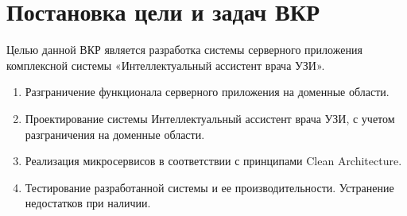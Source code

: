 \section{Постановка цели и задач ВКР}

Целью данной ВКР является разработка системы серверного приложения комплексной системы «Интеллектуальный ассистент врача УЗИ».

\begin{enumerate}
    \item Разграничение функционала серверного приложения на доменные области.
    \item Проектирование системы Интеллектуальный ассистент врача УЗИ, с учетом разграничения на доменные области.
    \item Реализация микросервисов в соответствии с принципами Clean Architecture.
	\item Тестирование разработанной системы и ее производительности. Устранение недостатков при наличии.
\end{enumerate}




